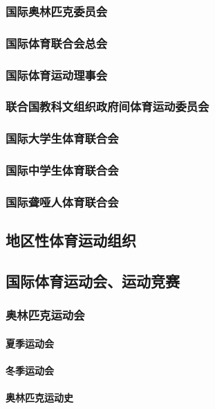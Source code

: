 \documentclass[UTF8]{../../ApplicationUniverse}
\begin{document}
        \subsubsection{国际奥林匹克委员会}
        \subsubsection{国际体育联合会总会}
        \subsubsection{国际体育运动理事会}
        \subsubsection{联合国教科文组织政府间体育运动委员会}
        \subsubsection{国际大学生体育联合会}
        \subsubsection{国际中学生体育联合会}
        \subsubsection{国际聋哑人体育联合会}
    \subsection{地区性体育运动组织}


    \subsection{国际体育运动会、运动竞赛}
        \subsubsection{奥林匹克运动会}
            \paragraph{夏季运动会}
            \paragraph{冬季运动会}
            \paragraph{奥林匹克运动史}
\end{document}
